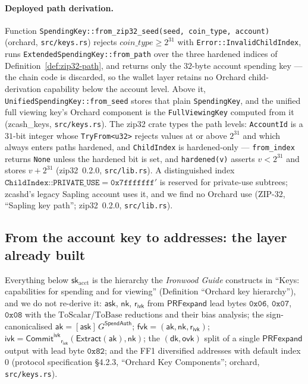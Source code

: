 \documentclass[11pt,a4paper]{article}
\theoremstyle{definition}
\newcommand{\CommitIvk}{\ensuremath{\mathsf{Commit}^{\mathsf{ivk}}}}
\newcommand{\Extract}{\ensuremath{\mathsf{Extract}}}
\newcommand{\ask}{\ensuremath{\mathsf{ask}}}
\newcommand{\aksym}{\ensuremath{\mathsf{ak}}}
\newcommand{\nksym}{\ensuremath{\mathsf{nk}}}
\newcommand{\ivk}{\ensuremath{\mathsf{ivk}}}
\newcommand{\fvk}{\ensuremath{\mathsf{fvk}}}
\newcommand{\ovk}{\ensuremath{\mathsf{ovk}}}
\newcommand{\dk}{\ensuremath{\mathsf{dk}}}
\newcommand{\rivk}{\ensuremath{\mathsf{r_{ivk}}}}
\begin{document}
\paragraph{Deployed path derivation.} Function
\texttt{SpendingKey::from\_zip32\_seed(seed, coin\_type, account)}
(\textsf{orchard}, \texttt{src/keys.rs}) rejects
$\mathit{coin\_type} \ge 2^{31}$ with \texttt{Error::InvalidChildIndex},
runs \texttt{ExtendedSpendingKey::from\_path} over the three hardened
indices of Definition~\ref{def:zip32-path}, and returns only the $32$-byte
account spending key --- the chain code is discarded, so the wallet layer
retains no Orchard child-derivation capability below the account level.
Above it, \texttt{UnifiedSpendingKey::from\_seed} stores that plain
\texttt{SpendingKey}, and the unified full viewing key's Orchard component
is the \texttt{FullViewingKey} computed from it (\textsf{zcash\_keys},
\texttt{src/keys.rs}). The \textsf{zip32} crate types the path levels:
\texttt{AccountId} is a $31$-bit integer whose \texttt{TryFrom<u32>}
rejects values at or above $2^{31}$ and which always enters paths hardened,
and \texttt{ChildIndex} is hardened-only --- \texttt{from\_index} returns
\texttt{None} unless the hardened bit is set, and \texttt{hardened(v)}
asserts $v < 2^{31}$ and stores $v + 2^{31}$ (\textsf{zip32}~0.2.0,
\texttt{src/lib.rs}). A distinguished index
$\texttt{ChildIndex::PRIVATE\_USE} = \mathtt{0x7fffffff}'$ is reserved for
private-use subtrees; \textsf{zcashd}'s legacy Sapling account uses it, and
we find no Orchard use (ZIP-32, ``Sapling key path'';
\textsf{zip32}~0.2.0, \texttt{src/lib.rs}).

\subsection{From the account key to addresses: the layer already built}\label{sec:zip32-fvk}

Everything below $\mathsf{sk}_{\mathrm{acct}}$ is the hierarchy the
\emph{Ironwood Guide} constructs in ``Keys: capabilities for spending and
for viewing'' (Definition ``Orchard key hierarchy''), and we do not
re-derive it: $\ask$, $\nksym$, $\rivk$ from $\mathsf{PRFexpand}$ lead
bytes $\mathtt{0x06}$, $\mathtt{0x07}$, $\mathtt{0x08}$ with the
$\mathrm{ToScalar}$/$\mathrm{ToBase}$ reductions and their bias analysis;
the sign-canonicalised $\aksym = [\ask]\,G^{\mathsf{SpendAuth}}$;
$\fvk = (\aksym, \nksym, \rivk)$;
$\ivk = \CommitIvk_{\rivk}(\Extract(\aksym), \nksym)$; the
$(\dk, \ovk)$ split of a single $\mathsf{PRFexpand}$ output with lead byte
$\mathtt{0x82}$; and the FF1 diversified addresses with default index $0$
(protocol specification \S4.2.3, ``Orchard Key Components'';
\textsf{orchard}, \texttt{src/keys.rs}).
\end{document}
